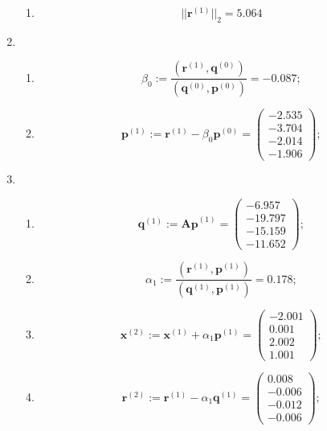 \begin{enumerate}
\begin{enumerate}
        \item $$||\mathbf{r}^{(1)}||_2 = \mathbf{5.064}$$
    \end{enumerate}

    \item \begin{enumerate}
        \item $$\beta_0 :=
        \dfrac{(\mathbf{r}^{(1)}, \mathbf{q}^{(0)})}{(\mathbf{q}^{(0)}, \mathbf{p}^{(0)})} = -0.087;$$

        \item $$\mathbf{p}^{(1)} :=
        \mathbf{r}^{(1)}-\beta_0\mathbf{p}^{(0)} = \begin{pmatrix} -2.535\\-3.704\\-2.014\\-1.906 \end{pmatrix};$$
    \end{enumerate}

    \item \begin{enumerate}
        \item $$\mathbf{q}^{(1)} :=
        \mathbf{Ap}^{(1)} = \begin{pmatrix} -6.957\\-19.797\\-15.159\\-11.652 \end{pmatrix};$$

        \item $$\alpha_1 :=
        \dfrac{(\mathbf{r}^{(1)}, \mathbf{p}^{(1)})}{(\mathbf{q}^{(1)}, \mathbf{p}^{(1)})} = 0.178;$$

        \item $$\mathbf{x}^{(2)} :=
        \mathbf{x}^{(1)}+\alpha_1\mathbf{p}^{(1)} = \begin{pmatrix} -2.001\\0.001\\2.002\\1.001 \end{pmatrix};$$

        \item $$\mathbf{r}^{(2)} :=
        \mathbf{r}^{(1)}-\alpha_1\mathbf{q}^{(1)} = \begin{pmatrix} 0.008\\-0.006\\-0.012\\-0.006 \end{pmatrix};$$


\end{enumerate}
\end{enumerate}
